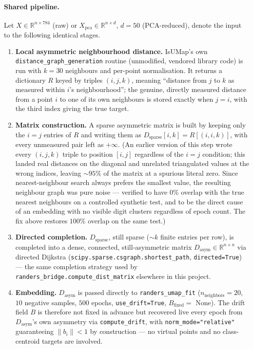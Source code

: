 \documentclass{article}
\begin{document}
\paragraph{Shared pipeline.} Let $X \in \mathbb{R}^{n \times 784}$ (raw) or $X_{\mathrm{pca}} \in \mathbb{R}^{n \times d}$, $d=50$ (PCA-reduced), denote the input to the following identical stages.
\begin{enumerate}
    \item \textbf{Local asymmetric neighbourhood distance.} IsUMap's own \texttt{distance\_graph\_generation} routine (unmodified, vendored library code) is run with $k=30$ neighbours and per-point normalisation. It returns a dictionary $R$ keyed by triples $(i,j,k)$, meaning ``distance from $j$ to $k$ as measured within $i$'s neighbourhood''; the genuine, directly measured distance from a point $i$ to one of its own neighbours is stored exactly when $j=i$, with the third index giving the true target.
    \item \textbf{Matrix construction.} A sparse asymmetric matrix is built by keeping only the $i=j$ entries of $R$ and writing them as $D_{\mathrm{sparse}}[i,k]=R[(i,i,k)]$, with every unmeasured pair left as $+\infty$. (An earlier version of this step wrote every $(i,j,k)$ triple to position $[i,j]$ regardless of the $i=j$ condition; this landed real distances on the diagonal and unrelated triangulated values at the wrong indices, leaving $\sim\!95\%$ of the matrix at a spurious literal zero. Since nearest-neighbour search always prefers the smallest value, the resulting neighbour graph was pure noise — verified to have $0\%$ overlap with the true nearest neighbours on a controlled synthetic test, and to be the direct cause of an embedding with no visible digit clusters regardless of epoch count. The fix above restores $100\%$ overlap on the same test.)
    \item \textbf{Directed completion.} $D_{\mathrm{sparse}}$, still sparse ($\sim\!k$ finite entries per row), is completed into a dense, connected, still-asymmetric matrix $D_{\mathrm{asym}} \in \mathbb{R}^{n\times n}$ via directed Dijkstra (\texttt{scipy.sparse.csgraph.shortest\_path}, \texttt{directed=True}) — the same completion strategy used by \texttt{randers\_bridge.compute\_dist\_matrix} elsewhere in this project.
    \item \textbf{Embedding.} $D_{\mathrm{asym}}$ is passed directly to \texttt{randers\_umap\_fit} ($n_{\mathrm{neighbors}}=20$, $10$ negative samples, $500$ epochs, \texttt{use\_drift=True}, $B_{\mathrm{fixed}}=$ None). The drift field $B$ is therefore not fixed in advance but recovered live every epoch from $D_{\mathrm{asym}}$'s own asymmetry via \texttt{compute\_drift}, with \texttt{norm\_mode="relative"} guaranteeing $\|b_i\|<1$ by construction — no virtual points and no class-centroid targets are involved.
\end{enumerate}
\end{document}
